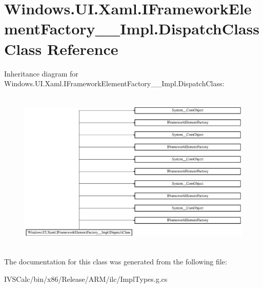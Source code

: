 \hypertarget{class_windows_1_1_u_i_1_1_xaml_1_1_i_framework_element_factory_____impl_1_1_dispatch_class}{}\section{Windows.\+U\+I.\+Xaml.\+I\+Framework\+Element\+Factory\+\_\+\+\_\+\+Impl.\+Dispatch\+Class Class Reference}
\label{class_windows_1_1_u_i_1_1_xaml_1_1_i_framework_element_factory_____impl_1_1_dispatch_class}
Inheritance diagram for Windows.\+U\+I.\+Xaml.\+I\+Framework\+Element\+Factory\+\_\+\+\_\+\+Impl.\+Dispatch\+Class\+:\begin{figure}[H]
\begin{center}
\leavevmode
\includegraphics[height=7.797468cm]{class_windows_1_1_u_i_1_1_xaml_1_1_i_framework_element_factory_____impl_1_1_dispatch_class}
\end{center}
\end{figure}


The documentation for this class was generated from the following file\+:\begin{DoxyCompactItemize}
\item 
I\+V\+S\+Calc/bin/x86/\+Release/\+A\+R\+M/ilc/Impl\+Types.\+g.\+cs\end{DoxyCompactItemize}
